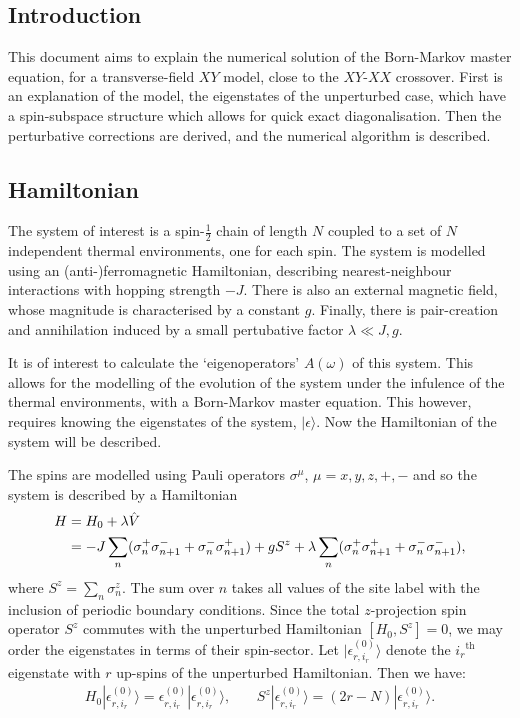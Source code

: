 \documentclass[a4paper]{memoir}
\newcommand{\ket}[1]{|#1\rangle}
\newcommand{\gap}{\,\,\,\,\,\,\,\,\,\,\,}
\newcommand{\enrnought}{\epsilon_{r,i_r}^{(0)}}
\begin{document}
%
\subsection*{Introduction}
%
This document aims to explain the numerical solution of the
Born-Markov master equation, for a transverse-field $XY$ model, close
to the $XY$-$XX$ crossover. First is an explanation of the model, the
eigenstates of the unperturbed case, which have a spin-subspace
structure which allows for quick exact diagonalisation. Then the
perturbative corrections are derived, and the numerical algorithm is
described.
%
\subsection*{Hamiltonian}
%
The system of interest is a spin-$\frac{1}{2}$ chain of length $N$
coupled to a set of $N$ independent thermal environments, one for each
spin. The system is modelled using an (anti-)ferromagnetic
Hamiltonian, describing nearest-neighbour interactions with hopping
strength $-J$. There is also an external magnetic field, whose
magnitude is characterised by a constant $g$. Finally, there is
pair-creation and annihilation induced by a small pertubative factor
$\lambda \ll J,g$.
%
\par It is of interest to calculate the `eigenoperators' $A(\omega)$
of this system. This allows for the modelling of the evolution of the
system under the infulence of the thermal environments, with a
Born-Markov master equation. This however, requires knowing the
eigenstates of the system, $\ket{\epsilon}$. Now the Hamiltonian of
the system will be described.
%
\par The spins are modelled using Pauli operators $\sigma^\mu$, $\mu =
x,y,z,+,-$ and so the system is described by a Hamiltonian
\begin{align}
  H&=H_0+\lambda \hat{V}\notag \\
   &=-J\sum_n(\sigma^+_n\sigma^-_{n+1}+\sigma^-_n\sigma^+_{n+1})+gS^z+
  \lambda\sum_n(\sigma^+_n\sigma^+_{n+1}+\sigma^-_n\sigma^-_{n+1}),
\end{align}
where $S^z = \sum_n \sigma_n^z$. The sum over $n$ takes all values of
the site label with the inclusion of periodic boundary conditions.
Since the total $z$-projection spin operator $S^z$ commutes with the
unperturbed Hamiltonian $[H_0,S^z]=0$, we may order the eigenstates in
terms of their spin-sector. Let $\ket{\enrnought}$ denote the
${i_r}^\text{th}$ eigenstate with $r$ up-spins of the unperturbed
Hamiltonian. Then we have:
\begin{align}
  H_0\ket{\enrnought}=\epsilon_{r,i_r}^{(0)}\ket{\enrnought},\gap
  S^z\ket{\enrnought}=(2r-N)\ket{\enrnought}.
\end{align}
\end{document}
